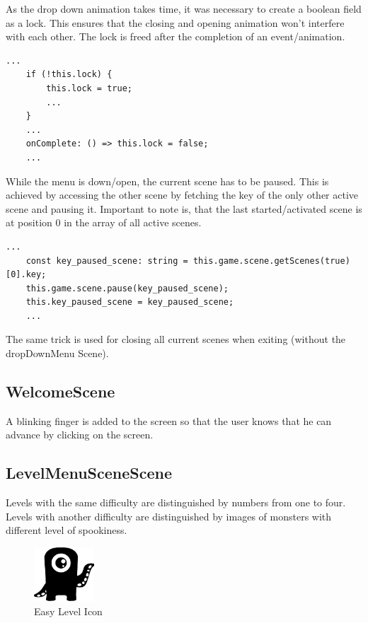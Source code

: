As the drop down animation takes time, it was necessary to create a boolean field as a lock.
This ensures that the closing and opening animation won't interfere with each other.
The lock is freed after the completion of an event/animation.

\begin{lstlisting}[style=TypeScript, caption={Lock aquiring and freeing}]
    ...
    if (!this.lock) {
        this.lock = true;
        ...
    }
    ...
    onComplete: () => this.lock = false;
    ...
\end{lstlisting}

While the menu is down/open, the current scene has to be paused.
This is achieved by accessing the other scene by fetching the key of the only other active scene and pausing it.
Important to note is, that the last started/activated scene is at position 0 in the array of all active scenes.
\begin{lstlisting}[style=TypeScript, caption={Fetching current active scene}]
    ...
    const key_paused_scene: string = this.game.scene.getScenes(true)[0].key;
    this.game.scene.pause(key_paused_scene);
    this.key_paused_scene = key_paused_scene;
    ...
\end{lstlisting}

The same trick is used for closing all current scenes when exiting (without the dropDownMenu Scene).

\subsection{WelcomeScene}\label{subsec:welcomescene}
A blinking finger is added to the screen so that the user knows that he can advance by clicking on the screen.

\subsection{LevelMenuSceneScene}\label{subsec:levelmenuscenescene}
Levels with the same difficulty are distinguished by numbers from one to four.
Levels with another difficulty are distinguished by images of monsters with different level of spookiness.

\begin{figure}[H]
    \centering
    \includegraphics[width=0.2\textwidth]{figures/easylevelicon}
    \caption{Easy Level Icon}
    \label{fig:easylevelicon}
\end{figure}

